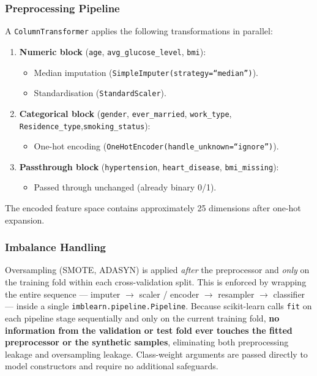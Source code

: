 \documentclass[11pt,a4paper]{article}
\begin{document}
\subsubsection{Preprocessing Pipeline}

A \texttt{ColumnTransformer} applies the following transformations in parallel:

\begin{enumerate}
  \item \textbf{Numeric block} (\texttt{age}, \texttt{avg\_glucose\_level}, \texttt{bmi}):
        \begin{itemize}
          \item Median imputation (\texttt{SimpleImputer(strategy=``median'')}).
          \item Standardisation (\texttt{StandardScaler}).
        \end{itemize}
  \item \textbf{Categorical block} (\texttt{gender}, \texttt{ever\_married}, \texttt{work\_type}, \texttt{Residence\_type},\linebreak \texttt{smoking\_status}):
        \begin{itemize}
          \item One-hot encoding (\texttt{OneHotEncoder(handle\_unknown=``ignore'')}).
        \end{itemize}
  \item \textbf{Passthrough block} (\texttt{hypertension}, \texttt{heart\_disease}, \texttt{bmi\_missing}):
        \begin{itemize}
          \item Passed through unchanged (already binary 0/1).
        \end{itemize}
\end{enumerate}

The encoded feature space contains approximately 25 dimensions after one-hot expansion.

\subsubsection{Imbalance Handling}

Oversampling (SMOTE, ADASYN) is applied \emph{after} the preprocessor and \emph{only} on the training fold within each cross-validation split.
This is enforced by wrapping the entire sequence — imputer $\to$ scaler / encoder $\to$ resampler $\to$ classifier — inside a single \texttt{imblearn.pipeline.Pipeline}.
Because scikit-learn calls \texttt{fit} on each pipeline stage sequentially and only on the current training fold, \textbf{no information from the validation or test fold ever touches the fitted preprocessor or the synthetic samples}, eliminating both preprocessing leakage and oversampling leakage.
Class-weight arguments are passed directly to model constructors and require no additional safeguards.
\end{document}
